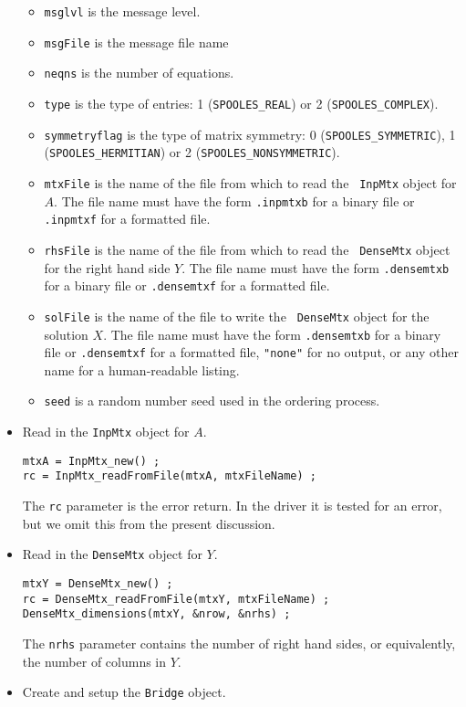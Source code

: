 \begin{itemize}
\begin{itemize}
\item {\tt msglvl} is the message level.
\item {\tt msgFile} is the message file name
\item {\tt neqns} is the number of equations.
\item {\tt type} is the type of entries:
1 ({\tt SPOOLES\_REAL}) or
2 ({\tt SPOOLES\_COMPLEX}).
\item {\tt symmetryflag} is the type of matrix symmetry:
0 ({\tt SPOOLES\_SYMMETRIC}),
1 ({\tt SPOOLES\_HERMITIAN}) or
2 ({\tt SPOOLES\_NONSYMMETRIC}).
\item {\tt mtxFile} is the name of the file from which to read the {\tt
InpMtx} object for $A$.
The file name must have the form {\tt *.inpmtxb} for a binary file or
{\tt *.inpmtxf} for a formatted file.
\item {\tt rhsFile} is the name of the file from which to read the {\tt
DenseMtx} object for the right hand side $Y$.
The file name must have the form {\tt *.densemtxb} for a binary file or
{\tt *.densemtxf} for a formatted file.
\item {\tt solFile} is the name of the file to write the {\tt
DenseMtx} object for the solution $X$.
The file name must have the form {\tt *.densemtxb} for a binary file or
{\tt *.densemtxf} for a formatted file, {\tt "none"} for no output,
or any other name for a human-readable listing.
\item {\tt seed} is a random number seed used in the ordering process.
\end{itemize}
%
\item Read in the {\tt InpMtx} object for $A$.
\begin{verbatim}
mtxA = InpMtx_new() ;
rc = InpMtx_readFromFile(mtxA, mtxFileName) ;
\end{verbatim}
The {\tt rc} parameter is the error return. 
In the driver it is tested for an error, but we omit this from the
present discussion.
%
\item Read in the {\tt DenseMtx} object for $Y$.
\begin{verbatim}
mtxY = DenseMtx_new() ;
rc = DenseMtx_readFromFile(mtxY, mtxFileName) ;
DenseMtx_dimensions(mtxY, &nrow, &nrhs) ;
\end{verbatim}
The {\tt nrhs} parameter contains the number of right hand sides,
or equivalently, the number of columns in $Y$.
%
\item Create and setup the {\tt Bridge} object.
\begin{verbatim}

\end{verbatim}
\end{itemize}
